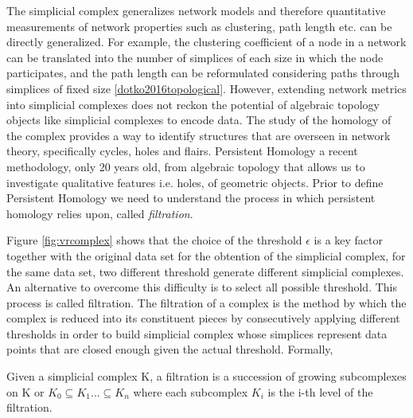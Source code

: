 \documentclass[onecollarge,runningheads]{svjour2}
\begin{document}
The simplicial complex generalizes network models and therefore quantitative measurements of network properties such as clustering, path length etc. can be directly generalized. For example, the clustering coefficient of a node in a network can be translated into the number of simplices of each size in which the node participates, and the path length can be reformulated considering paths through simplices of fixed size \ref{dotko2016topological}. However, extending network metrics into simplicial complexes does not reckon the potential of algebraic topology objects like simplicial complexes to encode data. 
The study of the homology of the complex provides a way to identify structures that are overseen in network theory, specifically cycles, holes and flairs. Persistent Homology a recent methodology, only 20 years old, from algebraic topology that allows us to investigate qualitative features i.e. holes, of geometric objects. Prior to define Persistent Homology we need to understand the process in which persistent homology relies upon, called \emph{filtration}.

Figure \ref{fig:vrcomplex} shows that the choice of the threshold $\epsilon$ is a key factor together with the original data set for the obtention of the simplicial complex, for the same data set, two different threshold generate different simplicial complexes. 
An alternative to overcome this difficulty is to select all possible threshold. This process is called filtration. The filtration of a complex is the method by which the complex is reduced into its constituent pieces by consecutively applying different thresholds in order to build simplicial complex whose simplices represent data points that are closed enough given the actual threshold. 
Formally,
\begin{definition}
Given a simplicial complex K, a filtration is a succession of growing subcomplexes on K or $K_0 \subseteq K_1 ...   \subseteq K_n$ where each subcomplex $K_i$ is the i-th level of the filtration. 
\end{definition}
\end{document}
